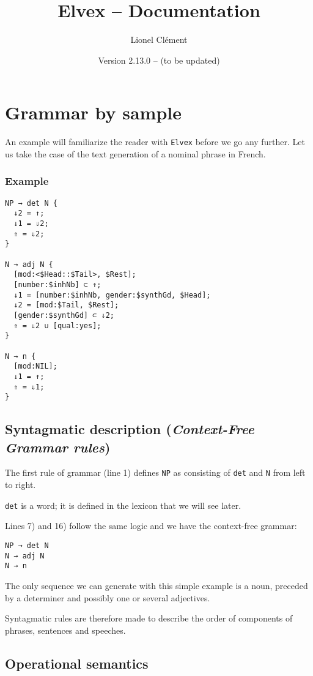 \documentclass[11pt]{article}
\title{Elvex -- Documentation}
\author{Lionel Clément}
\date{Version 2.13.0 --  (to be updated)}
\begin{document}
\maketitle
\section{Grammar by sample}

An example will familiarize the reader with \texttt{Elvex} before we
go any further. Let us take the case of the text generation of a
nominal phrase in French.

\subsubsection*{Example}

\begin{lstlisting}
NP → det N {
  ↓2 = ↑;
  ↓1 = ⇓2;
  ⇑ = ⇓2;
}

N → adj N {
  [mod:<$Head::$Tail>, $Rest];
  [number:$inhNb] ⊂ ↑;
  ↓1 = [number:$inhNb, gender:$synthGd, $Head];
  ↓2 = [mod:$Tail, $Rest];
  [gender:$synthGd] ⊂ ⇓2;
  ⇑ = ⇓2 ∪ [qual:yes];
}

N → n {
  [mod:NIL];
  ↓1 = ↑;
  ⇑ = ⇓1;
}
\end{lstlisting}

\subsection{Syntagmatic description (\textit{Context-Free Grammar rules})}
 
The first rule of grammar (line 1) defines \texttt{NP} as
consisting of \texttt{det} and \texttt{N} from left to right.

\texttt{det} is a word; it is defined in the lexicon that we will see
later.

Lines 7) and 16) follow the same logic and we have the
context-free grammar:

\begin{lstlisting}[numbers=none]
NP → det N
N → adj N
N → n
\end{lstlisting}

The only sequence we can generate with this simple example is
a noun, preceded by a determiner and possibly one or several adjectives.

Syntagmatic rules are therefore made to describe the order of
components of phrases, sentences and speeches.

\subsection{Operational semantics}
\end{document}
